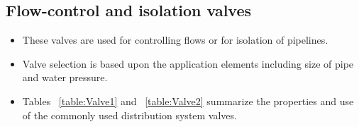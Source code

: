 \subsection{Flow-control and isolation valves}
\begin{itemize}
\item These valves are used for controlling flows or for isolation of pipelines.
\item Valve selection is based upon the application elements including size of pipe and water pressure.
\item Tables ~\ref{table:Valve1} and ~\ref{table:Valve2} summarize the properties and use of the commonly used distribution system valves. 
\end{itemize}
\newpage
\thispagestyle{empty}
   \vspace{-2em} 
